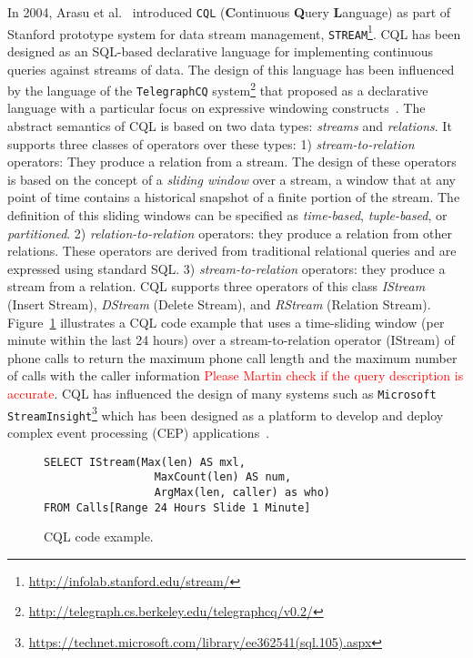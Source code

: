 In 2004, Arasu et al.~\cite{arasu_widom_2004} introduced  \texttt{CQL} (\textbf{C}ontinuous \textbf{Q}uery \textbf{L}anguage) as part of Stanford prototype system for data stream management, \texttt{STREAM}\footnote{\url{http://infolab.stanford.edu/stream/}}. CQL has been designed as an SQL-based declarative language for implementing continuous queries against streams of data. The design of this language has been influenced by the language of the \texttt{TelegraphCQ} system\footnote{\url{http://telegraph.cs.berkeley.edu/telegraphcq/v0.2/}} that proposed as a declarative language with a particular focus on expressive windowing constructs~\cite{chandrasekaran_et_al_2003}. The abstract semantics of CQL is based on two data types: \emph{streams} and \emph{relations}. It supports three classes of operators over
these types: 1) \emph{stream-to-relation} operators: They produce a relation from a stream.  The design of these operators is based on the concept of a \emph{sliding window} over a stream, a window that at any point of time contains a historical snapshot of a finite portion of the stream. The definition of this sliding windows can be specified as \emph{time-based}, \emph{tuple-based},
or \emph{partitioned}. 2) \emph{relation-to-relation} operators: they produce a relation from other relations. These operators are derived from traditional relational queries and are expressed using standard SQL. 3) \emph{stream-to-relation} operators: they produce a stream from a relation. CQL supports three operators of this class \emph{IStream} (Insert Stream), \emph{DStream} (Delete Stream), and \emph{RStream} (Relation Stream).  Figure~\ref{fig:cql} illustrates a CQL code example that uses a time-sliding window (per minute within the last 24 hours) over a stream-to-relation operator (IStream) of phone calls to return the maximum phone call length and the maximum number of calls with the caller information \textcolor{red}{Please Martin check if the query description is accurate}. CQL has influenced the design of many systems such as \texttt{Microsoft StreamInsight}\footnote{\url{https://technet.microsoft.com/library/ee362541(sql.105).aspx}} which has been designed as a platform to develop and deploy complex event processing (CEP) applications~\cite{ali_et_al_2009}.
\begin{figure}
\begin{lstlisting}
SELECT IStream(Max(len) AS mxl,
                 MaxCount(len) AS num,
                 ArgMax(len, caller) as who)
FROM Calls[Range 24 Hours Slide 1 Minute]
\end{lstlisting}
\vspace*{-4mm}
\caption{\label{fig:cql}CQL code example.}
\end{figure}


